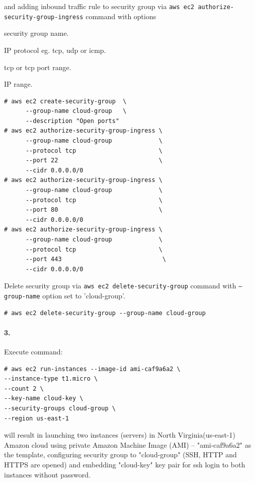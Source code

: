 \documentclass[a4paper]{article}
\begin{document}
and adding inbound traffic rule to security group via \texttt{aws ec2 authorize-security-group-ingress} command with options
\begin{description}
\leftskip 0.4in
\parindent -0.4in
	\item[\texttt{--group-name} : ] security group name.
	\item[\texttt{--protocol} : ] IP protocol eg. tcp, udp or icmp.
	\item[\texttt{--port} : ] tcp or tcp port range.
	\item[\texttt{-cidr} : ] IP range.
\end{description}
\begin{verbatim}
# aws ec2 create-security-group  \
      --group-name cloud-group   \
      --description "Open ports"
# aws ec2 authorize-security-group-ingress \
      --group-name cloud-group             \
      --protocol tcp                       \
      --port 22                            \
      --cidr 0.0.0.0/0
# aws ec2 authorize-security-group-ingress \
      --group-name cloud-group             \
      --protocol tcp                       \
      --port 80                            \
      --cidr 0.0.0.0/0
# aws ec2 authorize-security-group-ingress \
      --group-name cloud-group             \
      --protocol tcp                       \
      --port 443                            \
      --cidr 0.0.0.0/0
\end{verbatim}

Delete security group via \texttt{aws ec2 delete-security-group} command with \texttt{--group-name} option set to 'cloud-group'.

\begin{verbatim}
# aws ec2 delete-security-group --group-name cloud-group
\end{verbatim}

\paragraph{3. } Execute command:
\begin{verbatim}
# aws ec2 run-instances --image-id ami-caf9a6a2 \
--instance-type t1.micro \
--count 2 \
--key-name cloud-key \
--security-groups cloud-group \
--region us-east-1
\end{verbatim}
will result in launching two instances (servers) in North Virginia(us-east-1) Amazon cloud using private Amazon Machine Image (AMI) --  "ami-caf9a6a2" as the template, configuring security group to "cloud-group" (SSH, HTTP and HTTPS are opened) and embedding "cloud-key" key pair for ssh login to both instances without password. \\
\end{document}
